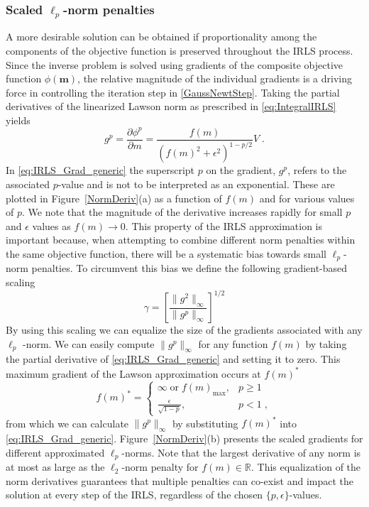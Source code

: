 \documentclass[extra,referee]{gji}
\begin{document}
\subsubsection{Scaled $\ell_p$-norm penalties}
A more desirable solution can be obtained if proportionality among the components of the objective function is preserved throughout the IRLS process.
Since the inverse problem is solved using gradients of the composite objective function $\phi(\mathbf{m})$, the relative magnitude of the individual gradients is a driving force in controlling the iteration step in \eqref{GaussNewtStep}.
Taking the partial derivatives of the linearized Lawson norm as prescribed in \eqref{eq:IntegralIRLS} yields
\begin{equation} \label{eq:IRLS_Grad_generic}
{g}^{p} = \frac{\partial \phi^{p}}{\partial {m}} = \frac{f(m)}{{{({f(m)}^{2} + \epsilon^2 )}^{1-p/2}} }V\;.
\end{equation}
In \eqref{eq:IRLS_Grad_generic} the superscript $p$ on the gradient, $g^p$, refers to the associated $p$-value and is not to be interpreted as an exponential.
These are plotted in Figure~\ref{NormDeriv}(a) as a function of $f(m)$ and for various values of $p$. We note that the magnitude of the derivative increases rapidly for small $p$ and $\epsilon$ values as $f(m) \rightarrow 0$.
This property of the IRLS approximation is important because, when attempting to combine different norm penalties within the same objective function, there will be a systematic bias towards small $\ell_p$-norm penalties.
To circumvent this bias we define the following gradient-based scaling
\begin{equation}\label{gammaScale}
\gamma = \left[\frac{\|g^2\|_\infty}{\|g^p\|_\infty}\right]^{1/2}
\end{equation}
By using this scaling we can equalize the size of the gradients associated with any $\ell_p$ -norm.
We can easily compute $\|g^p\|_\infty$ for any function $f(m)$ by taking the partial derivative of \eqref{eq:IRLS_Grad_generic} and setting it to zero. This maximum gradient of the Lawson approximation occurs at ${f(m)^*}$
\begin{equation}\label{mMaxGrad}
f(m)^* =
\begin{cases}
\infty \;\text{or}\; f(m)_{\text{max}},& p \geq 1 \\
\frac{\epsilon}{\sqrt{1-p}} ,&p < 1 \;,
\end{cases}
\end{equation}
from which we can calculate $\|g^p\|_\infty$ by substituting ${f(m)^*}$ into \eqref{eq:IRLS_Grad_generic}.
Figure~\ref{NormDeriv}(b) presents the scaled gradients for different approximated $\ell_p$-norms. Note that the largest derivative of any norm is at most as large as the $\ell_2$-norm penalty for $f(m) \in \mathbb{R}$. This equalization of the norm derivatives guarantees that multiple penalties can co-exist and impact the solution at every step of the IRLS, regardless of the chosen $\{p,\epsilon\}$-values.
\end{document}
